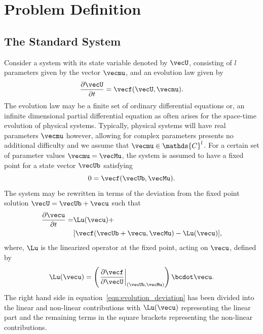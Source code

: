 \section{Problem Definition}
\label{sec:problem_setup}

\subsection{The Standard System}
\label{sec:standard}

Consider a system with its state variable denoted by $\vecU$, consisting of $l$ parameters given by the vector $\vecmu$, and an evolution law given by 
\begin{equation}
	\frac{\partial \vecU}{\partial t} = \vecf(\vecU,\vecmu).
	\label{eqn:evolution0}
\end{equation}
The evolution law may be a finite set of ordinary differential equations or, an infinite dimensional partial differential equation as often arises for the space-time evolution of physical systems. Typically, physical systems will have real parameters $\vecmu$ however, allowing for complex parameters presents no additional difficulty and we assume that $\vecmu \in \mathds{C}^{l}$. 
For a certain set of parameter values $\vecmu = \vecMu$, the system is assumed to have a fixed point for a state vector $\vecUb$ satisfying
\begin{equation}
	0 = \vecf(\vecUb,\vecMu).
	\label{eqn:fixed_point}
\end{equation}
The system may be rewritten in terms of the deviation from the fixed point solution $\vecU =  \vecUb + \vecu$ such that 
\begin{equation}
	\begin{split}
		\frac{\partial \vecu}{\partial t} =& \Lu(\vecu) + \\
		& [\vecf(\vecUb + \vecu,\vecMu) - \Lu(\vecu)],
	\end{split}
	\label{eqn:evolution_deviation}
\end{equation}
where, $\Lu$ is the linearized operator at the fixed point, acting on $\vecu$, defined by
\begin{align}
	\Lu(\vecu) = \left(\left.\frac{\partial \vecf}{\partial \vecU}\right|_{(\vecUb,\vecMu)} \right)\bcdot \vecu.
	\label{eqn:linearized_operator_u}
\end{align}
The right hand side in equation~\eqref{eqn:evolution_deviation} has been divided into the linear and non-linear contributions with $\Lu(\vecu)$ representing the linear part and the remaining terms in the square brackets representing the non-linear contributions.

